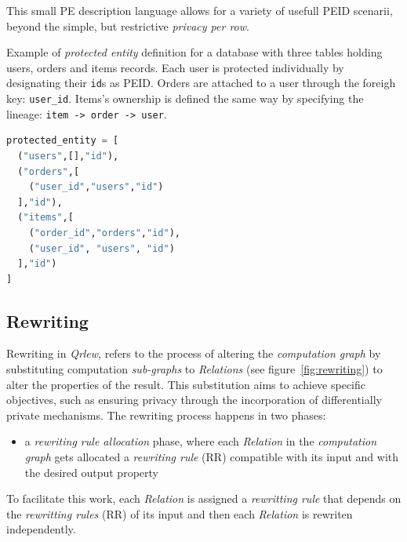 \documentclass[letterpaper]{article} %
\newcommand{\qrlew}{\emph{Qrlew}}
\begin{document}
This small PE description language allows for a variety of usefull PEID scenarii, beyond the simple, but restrictive \emph{privacy per row}.

\begin{listing}[tb]
\caption{Example of \emph{protected entity} definition for a database with three tables holding users, orders and items records. Each user is protected individually by designating their \texttt{id}s as PEID. Orders are attached to a user through the foreigh key: \texttt{user\_id}. Items's ownership is defined the same way by specifying the lineage: \texttt{item -> order -> user}.}%
\label{lst:pe}
\begin{lstlisting}[language=Python]
protected_entity = [
  ("users",[],"id"),
  ("orders",[
    ("user_id","users","id")
  ],"id"),
  ("items",[
    ("order_id","orders","id"),
    ("user_id", "users", "id")
  ],"id")
]
\end{lstlisting}
\end{listing}

\subsection{Rewriting}
\label{sec:rewritting}

Rewriting in \qrlew{}, refers to the process of altering the \emph{computation graph} by substituting computation \emph{sub-graphs} to \emph{Relations} (see figure~\ref{fig:rewriting}) to alter the properties of the result. This substitution aims to achieve specific objectives, such as ensuring privacy through the incorporation of differentially private mechanisms. The rewriting process happens in two phases:
\begin{itemize}
    \item a \emph{rewriting rule allocation} phase, where each \emph{Relation} in the \emph{computation graph} gets allocated a \emph{rewriting rule} (RR) compatible with its input and with the desired output property
\end{itemize}
To facilitate this work, each \emph{Relation} is assigned a \emph{rewritting rule} that depends on the \emph{rewritting rules} (RR) of its input and then each \emph{Relation} is rewriten independently.
\end{document}
